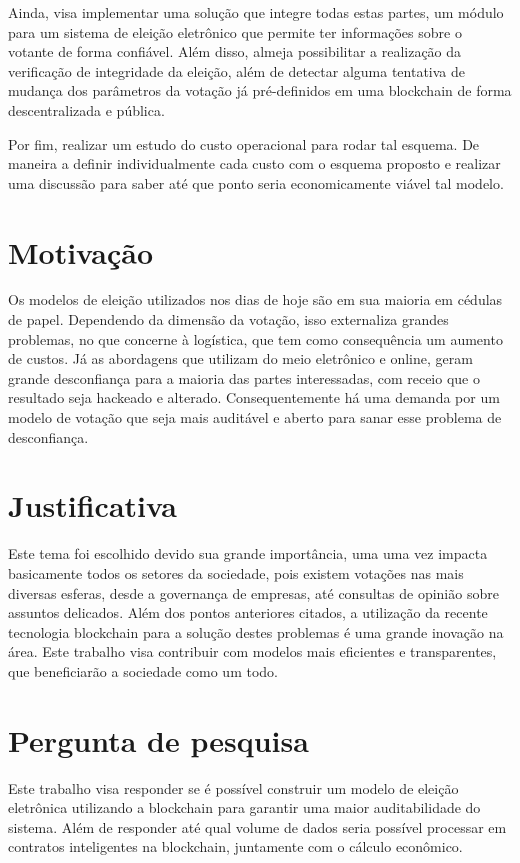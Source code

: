 \documentclass{ufsctex/ufsctex}
\begin{document}
Ainda, visa implementar uma solução que integre todas estas partes, um módulo
para um sistema de eleição eletrônico que permite ter informações sobre o
votante de forma confiável. Além disso, almeja possibilitar a realização da
verificação de integridade da eleição, além de detectar alguma tentativa de
mudança dos parâmetros da votação já pré-definidos em uma blockchain de forma
descentralizada e pública.

Por fim, realizar um estudo do custo operacional para rodar tal esquema. De
maneira a definir individualmente cada custo com o esquema proposto e realizar
uma discussão para saber até que ponto seria economicamente viável tal modelo.

\section{Motivação}

Os modelos de eleição utilizados nos dias de hoje são em sua maioria em cédulas
de papel. Dependendo da dimensão da votação, isso externaliza grandes problemas,
no que concerne à logística, que tem como consequência um aumento de custos. Já
as abordagens que utilizam do meio eletrônico e online, geram grande
desconfiança para a maioria das partes interessadas, com receio que o resultado
seja hackeado e alterado. Consequentemente há uma demanda por um modelo de
votação que seja mais auditável e aberto para sanar esse problema de
desconfiança.

\section{Justificativa}

Este tema foi escolhido devido sua grande importância, uma uma vez impacta
basicamente todos os setores da sociedade, pois existem votações nas mais
diversas esferas, desde a governança de empresas, até consultas de opinião sobre
assuntos delicados.  Além dos pontos anteriores citados, a utilização da recente
tecnologia blockchain para a solução destes problemas é uma grande inovação na
área. Este trabalho visa contribuir com modelos mais eficientes e transparentes,
que beneficiarão a sociedade como um todo.

\section{Pergunta de pesquisa}

Este trabalho visa responder se é possível construir um modelo de eleição
eletrônica utilizando a blockchain para garantir uma maior auditabilidade do
sistema. Além de responder até qual volume de dados seria possível processar em
contratos inteligentes na blockchain, juntamente com o cálculo econômico.
\end{document}
